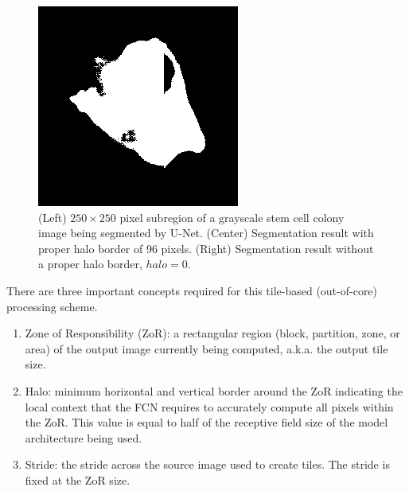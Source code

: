 \documentclass[twoside,11pt]{article}
\begin{document}
\begin{figure}
\begin{minipage}{0.32\columnwidth}
	\end{minipage}
	\begin{minipage}{0.32\columnwidth}
		\includegraphics[width=\columnwidth]{figs/no_halo.png}
	\end{minipage}
	\caption{(Left) $250 \times 250$ pixel subregion of a grayscale stem cell colony image being segmented by U-Net. (Center) Segmentation result with proper halo border of 96 pixels. (Right) Segmentation result without a proper halo border, $halo = 0$.} 
	\label{fig:nohalo}
\end{figure}

There are three important concepts required for this tile-based (out-of-core) processing scheme. 
\begin{enumerate}
	\item Zone of Responsibility (ZoR): a rectangular region (block, partition, zone, or area) of the output image currently being computed, a.k.a. the output tile size.
	\item Halo: minimum horizontal and vertical border around the ZoR indicating the local context that the FCN requires to accurately compute all pixels within the ZoR. This value is equal to half of the receptive field size of the model architecture being used. 
	\item Stride: the stride across the source image used to create tiles. The stride is fixed at the ZoR size.
\end{enumerate}
\end{document}
